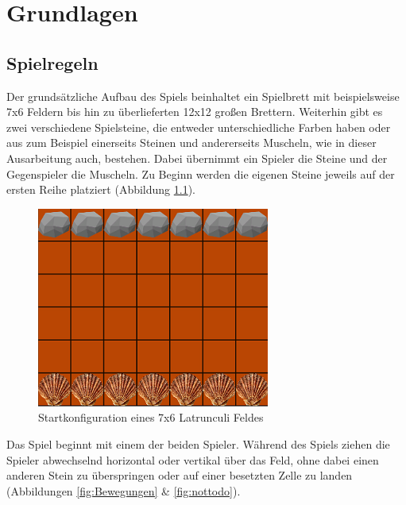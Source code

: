 
\chapter{Grundlagen}
\label{ch:Grundlagen}

\section{Spielregeln}
\label{ch:Grundlagen:sec:Abschnitt1}
Der grundsätzliche Aufbau des Spiels beinhaltet ein Spielbrett mit beispielsweise 7x6 Feldern bis hin zu überlieferten 12x12 großen Brettern. Weiterhin gibt es zwei verschiedene Spielsteine, die entweder unterschiedliche Farben haben oder aus zum Beispiel einerseits Steinen und andererseits Muscheln, wie in dieser Ausarbeitung auch, bestehen. Dabei übernimmt ein Spieler die Steine und der Gegenspieler die Muscheln. Zu Beginn werden die eigenen Steine jeweils auf der ersten Reihe  platziert (Abbildung \ref{fig:startzustand}).
\\

\begin{figure}[h]
	\centering
\includegraphics{img/regeln_startzustand2}
\caption{Startkonfiguration eines 7x6 Latrunculi Feldes}
\label{fig:startzustand}
\end{figure}

Das Spiel beginnt mit einem der beiden Spieler. Während des Spiels ziehen die Spieler abwechselnd horizontal oder vertikal über das Feld, ohne dabei einen anderen Stein zu überspringen oder auf einer besetzten Zelle zu landen (Abbildungen \ref{fig:Bewegungen} \& \ref{fig:nottodo}).


